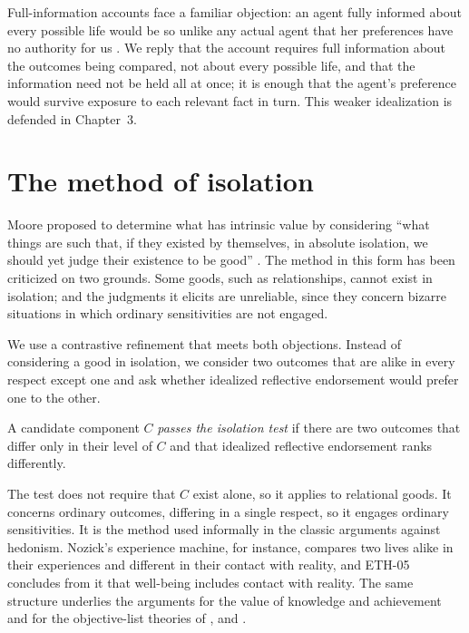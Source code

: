 \documentclass{situationist-preprint}
\begin{document}
Full-information accounts face a familiar objection: an agent fully informed about every possible life would be so unlike any actual agent that her preferences have no authority for us \citep{Rosati1995,Sobel1994}. We reply that the account requires full information about the outcomes being compared, not about every possible life, and that the information need not be held all at once; it is enough that the agent's preference would survive exposure to each relevant fact in turn. This weaker idealization is defended in Chapter~3.

\section{The method of isolation}

Moore proposed to determine what has intrinsic value by considering \enquote{what things are such that, if they existed by themselves, in absolute isolation, we should yet judge their existence to be good} \citep[\S 112]{Moore1903}. The method in this form has been criticized on two grounds. Some goods, such as relationships, cannot exist in isolation; and the judgments it elicits are unreliable, since they concern bizarre situations in which ordinary sensitivities are not engaged.

We use a contrastive refinement that meets both objections. Instead of considering a good in isolation, we consider two outcomes that are alike in every respect except one and ask whether idealized reflective endorsement would prefer one to the other.

\begin{definition}\label{d:pass}
A candidate component $C$ \emph{passes the isolation test} if there are two outcomes that differ only in their level of $C$ and that idealized reflective endorsement ranks differently.
\end{definition}

The test does not require that $C$ exist alone, so it applies to relational goods. It concerns ordinary outcomes, differing in a single respect, so it engages ordinary sensitivities. It is the method used informally in the classic arguments against hedonism. Nozick's experience machine, for instance, compares two lives alike in their experiences and different in their contact with reality, and ETH-05 concludes from it that well-being includes contact with reality. The same structure underlies the arguments for the value of knowledge and achievement \citep{Hurka1993} and for the objective-list theories of \citet{Parfit1984}, \citet{Griffin1986} and \citet{Fletcher2013}.
\end{document}
